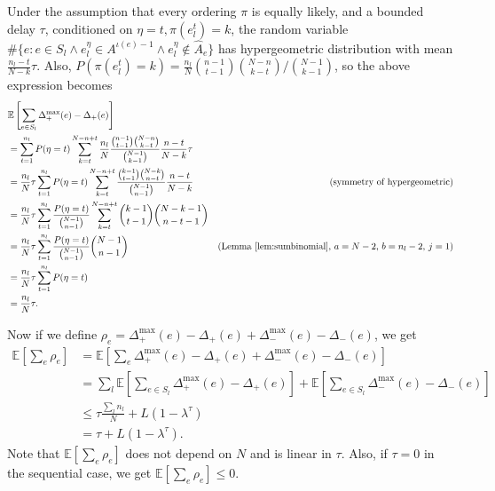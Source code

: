 Under the assumption that every ordering $\pi$ is equally likely, and a bounded delay $\tau$,
conditioned on $\eta = t, \pi(e_l^t)=k$, the random variable $\#\{e: e \in S_l \wedge e_l^\eta \in A^{\iota(e)-1} \wedge e_l^\eta \not\in \hat{A}_e\}$ has hypergeometric distribution with mean $\frac{n_l-t}{N-k}\tau$.
Also, $P(\pi(e_l^t) = k) = \frac{n_l}{N}{n-1 \choose t-1}{N-n \choose k-t} / {N-1 \choose k-1}$, so the above expression becomes
\begin{align*}
&\mathbb{E}\left[\sum_{e\in S_l}\Delta_+^{\max}(e) - \Delta_+(e)\right]\\
&= \sum_{t=1}^{n_l} P(\eta=t) \sum_{k=t}^{N-n+t} \frac{n_l}{N} \frac{{n-1 \choose t-1}{N-n \choose k-t}}{{N-1 \choose k-1}} \frac{n-t}{N-k} \tau\\
&= \frac{n_l}{N} \tau \sum_{t=1}^{n_l} P(\eta=t) \sum_{k=t}^{N-n+t} \frac{{k-1 \choose t-1}{N-k \choose n-t}}{{N-1 \choose n-1}} \frac{n-t}{N-k} & \text{(symmetry of hypergeometric)} \\
&= \frac{n_l}{N} \tau \sum_{t=1}^{n_l} \frac{P(\eta=t)}{{N-1 \choose n-1}} \sum_{k=t}^{N-n+t} {k-1 \choose t-1}{N-k-1 \choose n-t-1} \\
&= \frac{n_l}{N} \tau \sum_{t=1}^{n_l} \frac{P(\eta=t)}{{N-1 \choose n-1}} {N-1 \choose n-1} & \text{(Lemma \ref{lem:sumbinomial}, $a=N-2$, $b=n_l-2$, $j=1$)} \\
&= \frac{n_l}{N} \tau \sum_{t=1}^{n_l} P(\eta=t) \\
&= \frac{n_l}{N} \tau.
\end{align*}

Now if we define $\rho_e = \Delta_+^{\max}(e) - \Delta_+(e) + \Delta_-^{\max}(e) - \Delta_-(e)$, we get
\begin{align*}
\mathbb{E}\left[\sum_e \rho_e\right]
&= \mathbb{E}\left[\sum_e \Delta_+^{\max}(e) - \Delta_+(e) + \Delta_-^{\max}(e) - \Delta_-(e) \right]\\
&= \sum_l \mathbb{E}\left[\sum_{e\in S_l} \Delta_+^{\max}(e) - \Delta_+(e)\right] + \mathbb{E}\left[\sum_{e\in S_l} \Delta_-^{\max}(e) - \Delta_-(e) \right]\\
&\leq \tau\frac{\sum_l n_l}{N} + L(1-\lambda^\tau)\\
&= \tau + L(1-\lambda^\tau).
\end{align*}
Note that $\mathbb{E}\left[\sum_e \rho_e\right]$ does not depend on $N$ and is linear in $\tau$.
Also, if $\tau=0$ in the sequential case, we get $\mathbb{E}\left[\sum_e \rho_e\right] \leq 0$.

